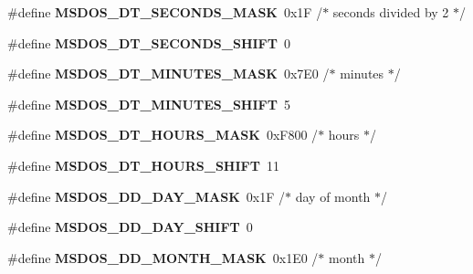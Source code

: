 \begin{DoxyCompactItemize}
\#define {\bfseries M\+S\+D\+O\+S\+\_\+\+D\+T\+\_\+S\+E\+C\+O\+N\+D\+S\+\_\+\+M\+A\+SK}~0x1\+F    /$\ast$ seconds divided by 2 $\ast$/
\item 
\mbox{\label{group__libfs__msdos_gabac2796e3b660ead4a33b23ba265ce22}} 
\#define {\bfseries M\+S\+D\+O\+S\+\_\+\+D\+T\+\_\+S\+E\+C\+O\+N\+D\+S\+\_\+\+S\+H\+I\+FT}~0
\item 
\mbox{\label{group__libfs__msdos_ga11f183560022851924941342177be1e8}} 
\#define {\bfseries M\+S\+D\+O\+S\+\_\+\+D\+T\+\_\+\+M\+I\+N\+U\+T\+E\+S\+\_\+\+M\+A\+SK}~0x7\+E0   /$\ast$ minutes $\ast$/
\item 
\mbox{\label{group__libfs__msdos_ga69ce9c881177614237e8193a6c1c1d88}} 
\#define {\bfseries M\+S\+D\+O\+S\+\_\+\+D\+T\+\_\+\+M\+I\+N\+U\+T\+E\+S\+\_\+\+S\+H\+I\+FT}~5
\item 
\mbox{\label{group__libfs__msdos_gadcea95b93bbc3b5345711b19dc90758e}} 
\#define {\bfseries M\+S\+D\+O\+S\+\_\+\+D\+T\+\_\+\+H\+O\+U\+R\+S\+\_\+\+M\+A\+SK}~0x\+F800  /$\ast$ hours $\ast$/
\item 
\mbox{\label{group__libfs__msdos_ga354674c528b132811ab4fbb64c8bc038}} 
\#define {\bfseries M\+S\+D\+O\+S\+\_\+\+D\+T\+\_\+\+H\+O\+U\+R\+S\+\_\+\+S\+H\+I\+FT}~11
\item 
\mbox{\label{group__libfs__msdos_ga3316a9374b66c9ed723a70a053d8fd58}} 
\#define {\bfseries M\+S\+D\+O\+S\+\_\+\+D\+D\+\_\+\+D\+A\+Y\+\_\+\+M\+A\+SK}~0x1\+F    /$\ast$ day of month $\ast$/
\item 
\mbox{\label{group__libfs__msdos_ga26bbee6fb037d171465cadb8c611c97b}} 
\#define {\bfseries M\+S\+D\+O\+S\+\_\+\+D\+D\+\_\+\+D\+A\+Y\+\_\+\+S\+H\+I\+FT}~0
\item 
\mbox{\label{group__libfs__msdos_ga2fe99fc38a97a6d381c3d17dc0ae42eb}} 
\#define {\bfseries M\+S\+D\+O\+S\+\_\+\+D\+D\+\_\+\+M\+O\+N\+T\+H\+\_\+\+M\+A\+SK}~0x1\+E0   /$\ast$ month $\ast$/
\item 
\mbox{\label{group__libfs__msdos_gaff82ed9a935295375dc0a042a138295c}} 

\end{DoxyCompactItemize}
